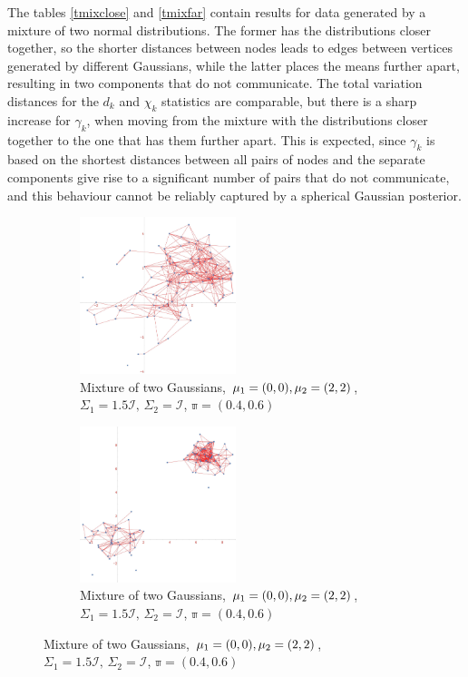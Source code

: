 \documentclass[12pt]{report}
\newcommand{\mc}[1]{\mathcal{#1}}
\newcommand{\mb}[1]{\mathbb{#1}}
\begin{document}
The tables \ref{tmixclose} and \ref{tmixfar} contain results for data generated by a mixture of two normal distributions. The former has the distributions closer together, so the shorter distances between nodes leads to edges between vertices generated by different Gaussians, while the latter places the means further apart, resulting in two components that do not communicate. The total variation distances for the $d_k$ and $\chi_k$ statistics are comparable, but there is a sharp increase for $\gamma_k$, when moving from the mixture with the distributions closer together to the one that has them further apart. This is expected, since $\gamma_k$ is based on the shortest distances between all pairs of nodes and the separate components give rise to a significant number of pairs that do not communicate, and this behaviour cannot be reliably captured by a spherical Gaussian posterior. \\

\begin{figure}[!ht]
\centering
\begin{subfigure}{.5\textwidth}
    \centering
    \includegraphics[width = 0.5\textwidth]{gaussian_mixtures.jpg}
    \caption{Mixture of two Gaussians, $\mu_1 = (0, 0),\\ \mu_2 = (2, 2)$, $\Sigma_1 = 1.5\mc{I},\, \Sigma_2 = \mc{I}$, $\mb{\pi} = (0.4, 0.6)$}
    \label{fmixclose}
\end{subfigure}%
\begin{subfigure}{.5\textwidth}
    \centering
    \includegraphics[width = 0.5\textwidth]{gaussian_mixtures_far.jpg}
    \caption{Mixture of two Gaussians, $\mu_1 = (0, 0),\\ \mu_2 = (2, 2)$, $\Sigma_1 = 1.5\mc{I},\, \Sigma_2 = \mc{I}$, $\mb{\pi} = (0.4, 0.6)$}
    \label{fmixfar}
\end{subfigure}
\end{figure}
\end{document}
